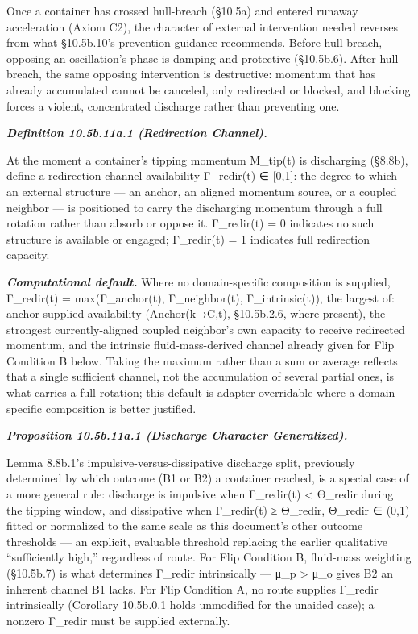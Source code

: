 \documentclass[
]{article}
\begin{document}
Once a container has crossed hull-breach (§10.5a) and entered runaway
acceleration (Axiom C2), the character of external intervention needed
reverses from what §10.5b.10's prevention guidance recommends. Before
hull-breach, opposing an oscillation's phase is damping and protective
(§10.5b.6). After hull-breach, the same opposing intervention is
destructive: momentum that has already accumulated cannot be canceled,
only redirected or blocked, and blocking forces a violent, concentrated
discharge rather than preventing one.

\emph{\textbf{Definition 10.5b.11a.1 (Redirection Channel).}}

At the moment a container's tipping momentum M\_tip(t) is discharging
(§8.8b), define a redirection channel availability Γ\_redir(t) ∈
{[}0,1{]}: the degree to which an external structure --- an anchor, an
aligned momentum source, or a coupled neighbor --- is positioned to
carry the discharging momentum through a full rotation rather than
absorb or oppose it. Γ\_redir(t) = 0 indicates no such structure is
available or engaged; Γ\_redir(t) = 1 indicates full redirection
capacity.

\emph{\textbf{Computational default.}} Where no domain-specific
composition is supplied, Γ\_redir(t) = max(Γ\_anchor(t), Γ\_neighbor(t),
Γ\_intrinsic(t)), the largest of: anchor-supplied availability
(Anchor(k→C,t), §10.5b.2.6, where present), the strongest
currently-aligned coupled neighbor's own capacity to receive redirected
momentum, and the intrinsic fluid-mass-derived channel already given for
Flip Condition B below. Taking the maximum rather than a sum or average
reflects that a single sufficient channel, not the accumulation of
several partial ones, is what carries a full rotation; this default is
adapter-overridable where a domain-specific composition is better
justified.

\emph{\textbf{Proposition 10.5b.11a.1 (Discharge Character
Generalized).}}

Lemma 8.8b.1's impulsive-versus-dissipative discharge split, previously
determined by which outcome (B1 or B2) a container reached, is a special
case of a more general rule: discharge is impulsive when Γ\_redir(t)
\textless{} Θ\_redir during the tipping window, and dissipative when
Γ\_redir(t) ≥ Θ\_redir, Θ\_redir ∈ (0,1) fitted or normalized to the
same scale as this document's other outcome thresholds --- an explicit,
evaluable threshold replacing the earlier qualitative ``sufficiently
high,'' regardless of route. For Flip Condition B, fluid-mass weighting
(§10.5b.7) is what determines Γ\_redir intrinsically --- μ\_p
\textgreater{} μ\_o gives B2 an inherent channel B1 lacks. For Flip
Condition A, no route supplies Γ\_redir intrinsically (Corollary
10.5b.0.1 holds unmodified for the unaided case); a nonzero Γ\_redir
must be supplied externally.
\end{document}
